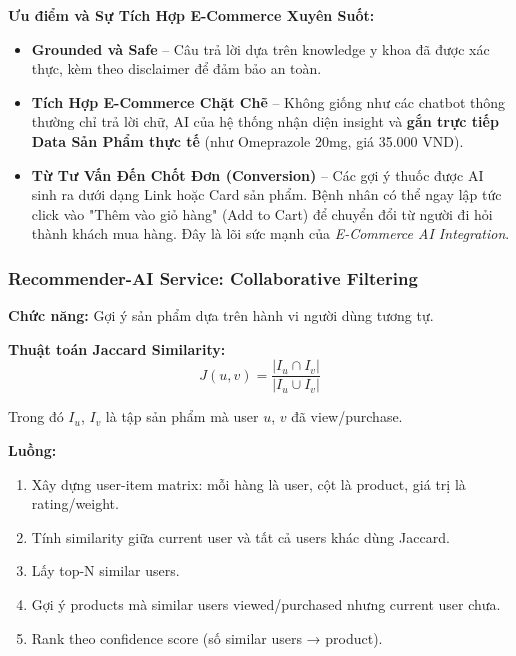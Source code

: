 \documentclass[12pt,a4paper]{article}
\begin{document}
\textbf{Ưu điểm và Sự Tích Hợp E-Commerce Xuyên Suốt:}
\begin{itemize}
    \item \textbf{Grounded và Safe} – Câu trả lời dựa trên knowledge y khoa đã được xác thực, kèm theo disclaimer để đảm bảo an toàn.
    \item \textbf{Tích Hợp E-Commerce Chặt Chẽ} – Không giống như các chatbot thông thường chỉ trả lời chữ, AI của hệ thống nhận diện insight và \textbf{gắn trực tiếp Data Sản Phẩm thực tế} (như Omeprazole 20mg, giá 35.000 VND).
    \item \textbf{Từ Tư Vấn Đến Chốt Đơn (Conversion)} – Các gợi ý thuốc được AI sinh ra dưới dạng Link hoặc Card sản phẩm. Bệnh nhân có thể ngay lập tức click vào "Thêm vào giỏ hàng" (Add to Cart) để chuyển đổi từ người đi hỏi thành khách mua hàng. Đây là lõi sức mạnh của \textit{E-Commerce AI Integration}.
\end{itemize}

\subsubsection{Recommender-AI Service: Collaborative Filtering}

\textbf{Chức năng:} Gợi ý sản phẩm dựa trên hành vi người dùng tương tự.

\textbf{Thuật toán Jaccard Similarity:}
$$J(u, v) = \frac{|I_u \cap I_v|}{|I_u \cup I_v|}$$

Trong đó $I_u$, $I_v$ là tập sản phẩm mà user $u$, $v$ đã view/purchase.

\textbf{Luồng:}
\begin{enumerate}
    \item Xây dựng user-item matrix: mỗi hàng là user, cột là product, giá trị là rating/weight.
    
    \item Tính similarity giữa current user và tất cả users khác dùng Jaccard.
    
    \item Lấy top-N similar users.
    
    \item Gợi ý products mà similar users viewed/purchased nhưng current user chưa.
    
    \item Rank theo confidence score (số similar users → product).
\end{enumerate}
\end{document}
